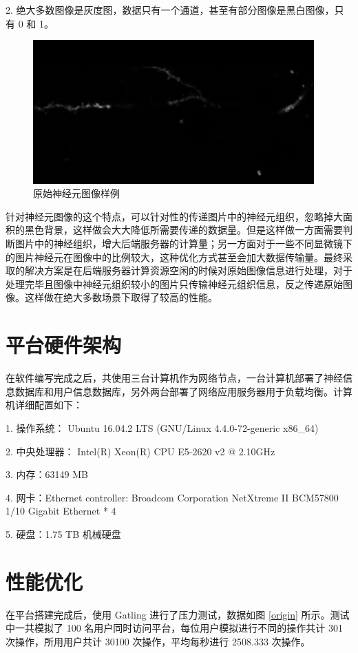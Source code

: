 2. 绝大多数图像是灰度图，数据只有一个通道，甚至有部分图像是黑白图像，只有 0 和 1。

\begin{figure}
\centering
\includegraphics[width=108mm]{images/neu}
\caption{原始神经元图像样例}
\label{neu}
\end{figure}


针对神经元图像的这个特点，可以针对性的传递图片中的神经元组织，忽略掉大面积的黑色背景，这样做会大大降低所需要传递的数据量。但是这样做一方面需要判断图片中的神经组织，增大后端服务器的计算量；另一方面对于一些不同显微镜下的图片神经元在图像中的比例较大，这种优化方式甚至会加大数据传输量。最终采取的解决方案是在后端服务器计算资源空闲的时候对原始图像信息进行处理，对于处理完毕且图像中神经元组织较小的图片只传输神经元组织信息，反之传递原始图像。这样做在绝大多数场景下取得了较高的性能。

\section{平台硬件架构}
在软件编写完成之后，共使用三台计算机作为网络节点，一台计算机部署了神经信息数据库和用户信息数据库，另外两台部署了网络应用服务器用于负载均衡。计算机详细配置如下：

1. 操作系统： Ubuntu 16.04.2 LTS (GNU/Linux 4.4.0-72-generic x86\_64)

2. 中央处理器： Intel(R) Xeon(R) CPU E5-2620 v2 @ 2.10GHz

3. 内存：63149 MB

4. 网卡：Ethernet controller: Broadcom Corporation NetXtreme II BCM57800 1/10 Gigabit Ethernet * 4

5. 硬盘：1.75 TB 机械硬盘

\section{性能优化}

在平台搭建完成后，使用 Gatling 进行了压力测试，数据如图 \ref{origin} 所示。测试中一共模拟了 100 名用户同时访问平台，每位用户模拟进行不同的操作共计 301 次操作，所用用户共计 30100 次操作，平均每秒进行 2508.333 次操作。

